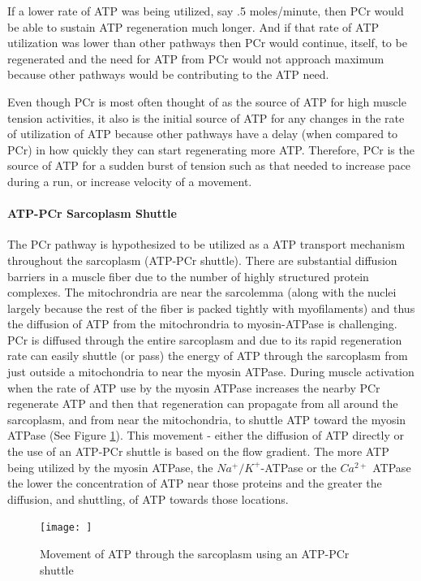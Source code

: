If a lower rate of ATP was being utilized, say .5 moles/minute, then PCr would be able to sustain ATP regeneration much longer. And if that rate of ATP utilization was lower than other pathways then PCr would continue, itself, to be regenerated and the need for ATP from PCr would not approach maximum because other pathways would be contributing to the ATP need.

Even though PCr is most often thought of as the source of ATP for high muscle tension activities, it also is the initial source of ATP for any changes in the rate of utilization of ATP because other pathways have a delay (when compared to PCr) in how quickly they can start regenerating more ATP. Therefore, PCr is the source of ATP for a sudden burst of tension such as that needed to increase pace during a run, or increase velocity of a movement.

\paragraph{ATP-PCr Sarcoplasm Shuttle}
The PCr pathway is hypothesized to be utilized as a ATP transport mechanism throughout the sarcoplasm (ATP-PCr shuttle). There are substantial diffusion barriers in a muscle fiber due to the number of highly structured protein complexes. The mitochrondria are near the sarcolemma (along with the nuclei largely because the rest of the fiber is packed tightly with myofilaments) and thus the diffusion of ATP from the mitochrondria to myosin-ATPase is challenging. PCr is diffused through the entire sarcoplasm and due to its rapid regeneration rate can easily shuttle (or pass) the energy of ATP through the sarcoplasm from just outside a mitochondria to near the myosin ATPase. During muscle activation when the rate of ATP use by the myosin ATPase increases the nearby PCr regenerate ATP and then that regeneration can propagate from all around the sarcoplasm, and from near the mitochondria, to shuttle ATP toward the myosin ATPase (See Figure \ref{fig:PCr}). This movement - either the diffusion of ATP directly or the use of an ATP-PCr shuttle is based on the flow gradient. The more ATP being utilized by the myosin ATPase, the $Na^+/K^+$-ATPase or the $Ca^{2+}$ ATPase the lower the concentration of ATP near those proteins and the greater the diffusion, and shuttling, of ATP towards those locations.

\begin{figure}[h!]
    \centering
    \texttt{[image: ]}
    \caption{Movement of ATP through the sarcoplasm using an ATP-PCr shuttle}
    \label{fig:PCr}
\end{figure}

